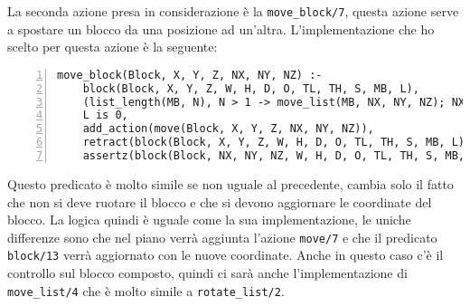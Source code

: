 La seconda azione presa in considerazione è la \verb+move_block/7+, questa azione serve a spostare un blocco da una posizione ad un'altra. L'implementazione che ho scelto per questa azione è la seguente:
\begin{Verbatim}[numbers=left]
move_block(Block, X, Y, Z, NX, NY, NZ) :-
    block(Block, X, Y, Z, W, H, D, O, TL, TH, S, MB, L),
    (list_length(MB, N), N > 1 -> move_list(MB, NX, NY, NZ); NX = NX, NY = NY, NZ = NZ),
    L is 0,
    add_action(move(Block, X, Y, Z, NX, NY, NZ)),
    retract(block(Block, X, Y, Z, W, H, D, O, TL, TH, S, MB, L)),
    assertz(block(Block, NX, NY, NZ, W, H, D, O, TL, TH, S, MB, L)).
\end{Verbatim}
Questo predicato è molto simile se non uguale al precedente, cambia solo il fatto che non si deve ruotare il blocco e che si devono aggiornare le coordinate del blocco. La logica quindi è uguale come la sua implementazione, le uniche differenze sono che nel piano verrà aggiunta l'azione \verb+move/7+ e che il predicato \verb+block/13+ verrà aggiornato con le nuove coordinate. Anche in questo caso c'è il controllo sul blocco composto, quindi ci sarà anche l'implementazione di \verb+move_list/4+ che è molto simile a \verb+rotate_list/2+.

